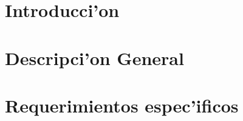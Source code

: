 \documentclass[spanish, a4paper, 10pt, titlepage]{article}
\author{Echevarr'ia - Farjat - Freijo - Giusto}
\begin{document}

\tableofcontents
\clearpage


\section{Introducci'on}


\clearpage
% 
\section{Descripci'on General	}
 
\clearpage
% 
\section{Requerimientos espec'ificos}
 
\clearpage
% 
% 
% 
% 
% 
% 
\end{document}
